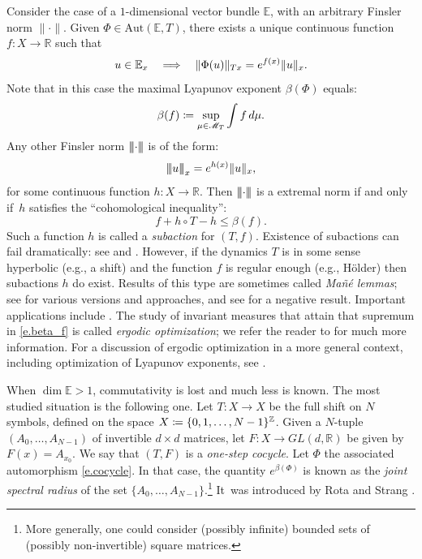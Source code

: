 \documentclass[JEP,XML,SOM,Unicode]{cedram}
\let\mathcal\mathscr
\def\vcentcolon{\mathrel{\mathop\ordinarycolon}}
\providecommand\ordinarycolon{:}
\providecommand*\coloneqq{\vcentcolon\mathrel{\mkern-1.2mu}=}
\newcommand\implique{\mathchoice{\Longrightarrow}{\Rightarrow}{\Rightarrow}{\Rightarrow}}
\theoremstyle{plain}
\theoremstyle{definition}
\newcommand{\tribar}[1]{\mathopen{| {\kern -1.5pt} | {\kern -1.5pt} |} {#1}
\mathclose{| {\kern -1.5pt} | {\kern -1.5pt} |}}
\newcommand{\RR}{\mathbb{R}}
\newcommand{\ZZ}{\mathbb{Z}}
\newcommand{\EE}{\mathbb{E}}
\newcommand{\cM}{\mathcal{M}}
\newcommand{\GL}{\mathit{GL}}
\newcommand{\Aut}{\mathrm{Aut}}
\begin{document}
Consider the case of a $1$-dimensional vector bundle $\EE$, with an arbitrary Finsler norm $\| \mathord{\cdot} \|$.
Given $\Phi \in \Aut(\EE,T)$, there exists a unique continuous function $f \colon X \to \RR$ such that
\begin{equation}\label{e.operator}
u \in \EE_x \quad \implique \quad \|\Phi(u)\|_{Tx} = e^{f(x)} \| u\|_x.
\end{equation}
Note that in this case the maximal Lyapunov exponent $\beta(\Phi)$ equals:
\begin{equation}\label{e.beta_f}
\beta (f) \coloneqq \sup_{\mu \in \cM_T} \int f \, d\mu.
\end{equation}
Any other Finsler norm $\tribar{\cdot}$ is of the form:
\[
\tribar{u}_x = e^{h(x)} \| u\|_x,
\]
for some continuous function $h \colon X \to \RR$.
Then $\tribar{\cdot}$ is a extremal norm if and only if~$h$ satisfies the ``cohomological inequality'':
\[
f + h \circ T - h \le \beta(f).
\]
Such a function $h$ is called a \emph{subaction} for $(T,f)$.
Existence of subactions can fail dramatically: see \eg \cite[\S3]{Bousch_Jenkinson} and \cite[App.]{Garibaldi_book}.
However, if the dynamics $T$ is in some sense hyperbolic (e.g., a shift) and the function $f$ is regular enough (e.g., Hölder) then subactions $h$ do exist. Results of this type are sometimes called \emph{Mañé lemmas}; see \hbox{\cite{CG,Sav,CLT,Bousch_Walters,Bousch_amphi}} for various versions and approaches, and see \cite[Prop.\,2.1]{Bochi_ICM} for a negative result.
Important applications include \cite{Bousch_Mairesse,Contreras}. The study of invariant measures that attain that supremum in \eqref{e.beta_f} is called \emph{ergodic optimization}; we refer the reader to \cite{Jenkinson_survey,Jenkinson_survey_new,Garibaldi_book} for much more information. For a discussion of ergodic optimization in a more general context, including optimization of Lyapunov exponents, see \cite{Bochi_ICM}.

When $\dim \EE > 1$, commutativity is lost and much less is known.
The most studied situation is the following one.
Let $T \colon X \to X$ be the full shift on $N$ symbols, defined on the space $X \coloneqq \{0,1,\dots,N-1\}^\ZZ$.
Given a $N$-tuple $(A_0,\dots,A_{N-1})$ of invertible $d \times d$ matrices, let
$F \colon X \to \GL(d,\RR)$ be given by $F(x) = A_{x_0}$.
We say that $(T,F)$ is a \emph{one-step cocycle}.
Let $\Phi$ the associated automorphism \eqref{e.cocycle}.
In that case, the quantity $e^{\beta(\Phi)}$ is known as the \emph{joint spectral radius} of the set $\{A_0,\dots,A_{N-1}\}$.\footnote{More generally, one could consider (possibly infinite) bounded sets of (possibly non-invertible) square matrices.}
It~was introduced by Rota and Strang \cite{RS}.
\end{document}

